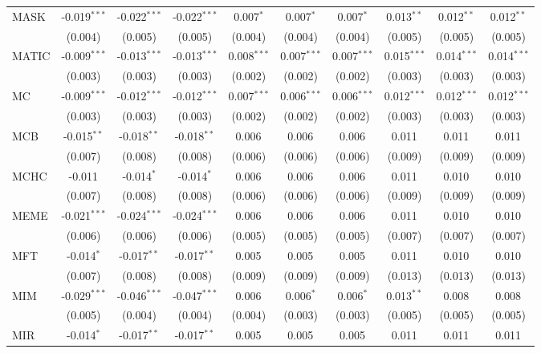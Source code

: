 \begin{table}[!htbp]
\begin{tabular}{@{\extracolsep{5pt}}lccccccccc}
 MASK & -0.019$^{***}$ & -0.022$^{***}$ & -0.022$^{***}$ & 0.007$^{*}$ & 0.007$^{*}$ & 0.007$^{*}$ & 0.013$^{**}$ & 0.012$^{**}$ & 0.012$^{**}$ \\
  & (0.004) & (0.005) & (0.005) & (0.004) & (0.004) & (0.004) & (0.005) & (0.005) & (0.005) \\
 MATIC & -0.009$^{***}$ & -0.013$^{***}$ & -0.013$^{***}$ & 0.008$^{***}$ & 0.007$^{***}$ & 0.007$^{***}$ & 0.015$^{***}$ & 0.014$^{***}$ & 0.014$^{***}$ \\
  & (0.003) & (0.003) & (0.003) & (0.002) & (0.002) & (0.002) & (0.003) & (0.003) & (0.003) \\
 MC & -0.009$^{***}$ & -0.012$^{***}$ & -0.012$^{***}$ & 0.007$^{***}$ & 0.006$^{***}$ & 0.006$^{***}$ & 0.012$^{***}$ & 0.012$^{***}$ & 0.012$^{***}$ \\
  & (0.003) & (0.003) & (0.003) & (0.002) & (0.002) & (0.002) & (0.003) & (0.003) & (0.003) \\
 MCB & -0.015$^{**}$ & -0.018$^{**}$ & -0.018$^{**}$ & 0.006$^{}$ & 0.006$^{}$ & 0.006$^{}$ & 0.011$^{}$ & 0.011$^{}$ & 0.011$^{}$ \\
  & (0.007) & (0.008) & (0.008) & (0.006) & (0.006) & (0.006) & (0.009) & (0.009) & (0.009) \\
 MCHC & -0.011$^{}$ & -0.014$^{*}$ & -0.014$^{*}$ & 0.006$^{}$ & 0.006$^{}$ & 0.006$^{}$ & 0.011$^{}$ & 0.010$^{}$ & 0.010$^{}$ \\
  & (0.007) & (0.008) & (0.008) & (0.006) & (0.006) & (0.006) & (0.009) & (0.009) & (0.009) \\
 MEME & -0.021$^{***}$ & -0.024$^{***}$ & -0.024$^{***}$ & 0.006$^{}$ & 0.006$^{}$ & 0.006$^{}$ & 0.011$^{}$ & 0.010$^{}$ & 0.010$^{}$ \\
  & (0.006) & (0.006) & (0.006) & (0.005) & (0.005) & (0.005) & (0.007) & (0.007) & (0.007) \\
 MFT & -0.014$^{*}$ & -0.017$^{**}$ & -0.017$^{**}$ & 0.005$^{}$ & 0.005$^{}$ & 0.005$^{}$ & 0.011$^{}$ & 0.010$^{}$ & 0.010$^{}$ \\
  & (0.007) & (0.008) & (0.008) & (0.009) & (0.009) & (0.009) & (0.013) & (0.013) & (0.013) \\
 MIM & -0.029$^{***}$ & -0.046$^{***}$ & -0.047$^{***}$ & 0.006$^{}$ & 0.006$^{*}$ & 0.006$^{*}$ & 0.013$^{**}$ & 0.008$^{}$ & 0.008$^{}$ \\
  & (0.005) & (0.004) & (0.004) & (0.004) & (0.003) & (0.003) & (0.005) & (0.005) & (0.005) \\
 MIR & -0.014$^{*}$ & -0.017$^{**}$ & -0.017$^{**}$ & 0.005$^{}$ & 0.005$^{}$ & 0.005$^{}$ & 0.011$^{}$ & 0.011$^{}$ & 0.011$^{}$ \\

\end{tabular}
\end{table}
